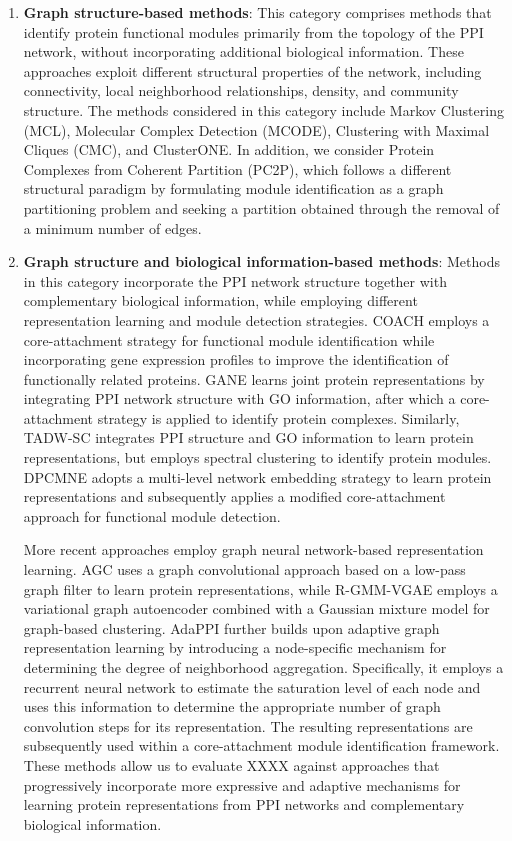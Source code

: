 \begin{enumerate}
	\item \textbf{Graph structure-based methods}:
	This category comprises methods that identify protein functional modules primarily from the topology of the PPI network, without incorporating additional biological information. These approaches exploit different structural properties of the network, including connectivity, local neighborhood relationships, density, and community structure. The methods considered in this category include Markov Clustering (MCL), Molecular Complex Detection (MCODE), Clustering with Maximal Cliques (CMC), and ClusterONE. In addition, we consider Protein Complexes from Coherent Partition (PC2P), which follows a different structural paradigm by formulating module identification as a graph partitioning problem and seeking a partition obtained through the removal of a minimum number of edges.
	
	\item \textbf{Graph structure and biological information-based methods}:
	Methods in this category incorporate the PPI network structure together with complementary biological information, while employing different representation learning and module detection strategies. COACH employs a core-attachment strategy for functional module identification while incorporating gene expression profiles to improve the identification of functionally related proteins. GANE learns joint protein representations by integrating PPI network structure with GO information, after which a core-attachment strategy is applied to identify protein complexes. Similarly, TADW-SC integrates PPI structure and GO information to learn protein representations, but employs spectral clustering to identify protein modules. DPCMNE adopts a multi-level network embedding strategy to learn protein representations and subsequently applies a modified core-attachment approach for functional module detection.
	
	More recent approaches employ graph neural network-based representation learning. AGC uses a graph convolutional approach based on a low-pass graph filter to learn protein representations, while R-GMM-VGAE employs a variational graph autoencoder combined with a Gaussian mixture model for graph-based clustering. AdaPPI further builds upon adaptive graph representation learning by introducing a node-specific mechanism for determining the degree of neighborhood aggregation. Specifically, it employs a recurrent neural network to estimate the saturation level of each node and uses this information to determine the appropriate number of graph convolution steps for its representation. The resulting representations are subsequently used within a core-attachment module identification framework. These methods allow us to evaluate XXXX against approaches that progressively incorporate more expressive and adaptive mechanisms for learning protein representations from PPI networks and complementary biological information.
	
\end{enumerate}

